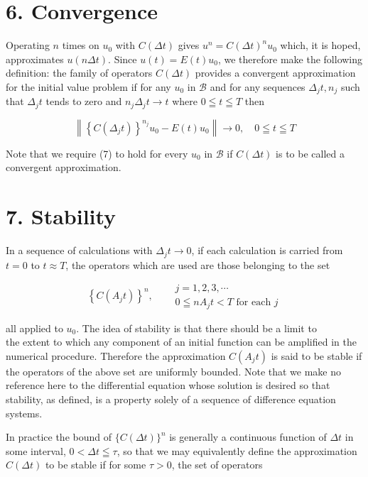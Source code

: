 \documentclass[10pt]{article}
\begin{document}
\section*{6. Convergence}
Operating \(n\) times on \(u_{0}\) with \(C(\Delta t)\) gives \(u^{n}=C(\Delta t)^{n} u_{0}\) which, it is hoped, approximates \(u(n \Delta t)\). Since \(u(t)=E(t) u_{0}\), we therefore make the following definition: the family of operators \(C(\Delta t)\) provides a convergent approximation for the initial value problem if for any \(u_{0}\) in \(\mathscr{B}\) and for any sequences \(\Delta_{j} t, n_{j}\) such that \(\Delta_{j} t\) tends to zero and \(n_{j} \Delta_{j} t \rightarrow t\) where \(0 \leqq t \leqq T\) then

\[
\left\|\left\{C\left(\Delta_{j} t\right)\right\}^{n_{j}} u_{0}-E(t) u_{0}\right\| \rightarrow 0, \quad 0 \leqq t \leqq T
\]

Note that we require (7) to hold for every \(u_{0}\) in \(\mathscr{B}\) if \(C(\Delta t)\) is to be called a convergent approximation.

\section*{7. Stability}
In a sequence of calculations with \(\Delta_{j} t \rightarrow 0\), if each calculation is carried from \(t=0\) to \(t \approx T\), the operators which are used are those belonging to the set

\[
\left\{C\left(A_{j} t\right)\right\}^{n}, \quad \begin{aligned}
& j=1,2,3, \cdots \\
& 0 \leqq n A_{j} t<T \text { for each } j
\end{aligned}
\]

all applied to \(u_{0}\). The idea of stability is that there should be a limit to\\
the extent to which any component of an initial function can be amplified in the numerical procedure. Therefore the approximation \(C\left(A_{j} t\right)\) is said to be stable if the operators of the above set are uniformly bounded. Note that we make no reference here to the differential equation whose solution is desired so that stability, as defined, is a property solely of a sequence of difference equation systems.

In practice the bound of \(\{C(\Delta t)\}^{n}\) is generally a continuous function of \(\Delta t\) in some interval, \(0<\Delta t \leqq \tau\), so that we may equivalently define the approximation \(C(\Delta t)\) to be stable if for some \(\tau>0\), the set of operators
\end{document}
